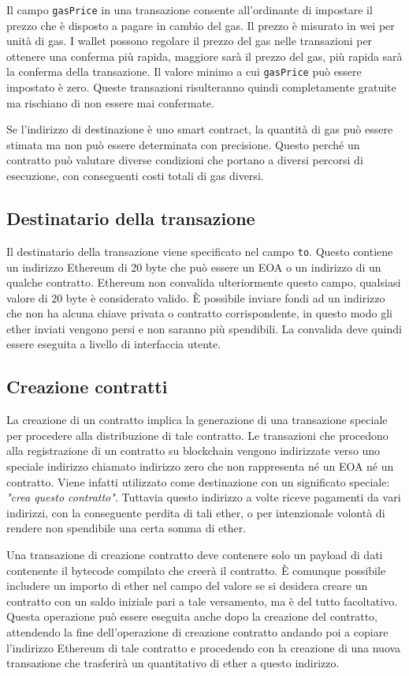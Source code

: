 Il campo \lstinline|gasPrice| in una transazione consente all'ordinante di impostare il prezzo che è disposto a pagare in cambio del gas. Il prezzo è misurato in wei per unità di gas. I wallet possono regolare il prezzo del gas nelle transazioni per ottenere una conferma più rapida, maggiore sarà il prezzo del gas, più rapida sarà la conferma della transazione. Il valore minimo a cui \lstinline|gasPrice| può essere impostato è zero. Queste transazioni risulteranno quindi completamente gratuite ma rischiano di non essere mai confermate. 

Se l'indirizzo di destinazione è uno smart contract, la quantità di gas può essere stimata ma non può essere determinata con precisione. Questo perché un contratto può valutare diverse condizioni che portano a diversi percorsi di esecuzione, con conseguenti costi totali di gas diversi. 

\subsection*{Destinatario della transazione}
Il destinatario della transazione viene specificato nel campo \lstinline|to|. Questo contiene un indirizzo Ethereum di 20 byte che può essere un EOA o un indirizzo di un qualche contratto. Ethereum non convalida ulteriormente questo campo, qualsiasi valore di 20 byte è considerato valido. \`E possibile inviare fondi ad un indirizzo che non ha alcuna chiave privata o contratto corrispondente, in questo modo gli ether inviati vengono persi e non saranno più spendibili. La convalida deve quindi essere eseguita a livello di interfaccia utente.

\subsection{Creazione contratti}
La creazione di un contratto implica la generazione di una transazione speciale per procedere alla distribuzione di tale contratto. Le transazioni che procedono alla registrazione di un contratto su blockchain vengono indirizzate verso uno speciale indirizzo chiamato indirizzo zero che non rappresenta né un EOA né un contratto. Viene infatti utilizzato come destinazione con un significato speciale: \textit{"crea questo contratto"}. Tuttavia questo indirizzo a volte riceve pagamenti da vari indirizzi, con la conseguente perdita di tali ether, o per intenzionale volontà di rendere non spendibile una certa somma di ether.

Una transazione di creazione contratto deve contenere solo un payload di dati contenente il bytecode compilato che creerà il contratto. \`E comunque possibile includere un importo di ether nel campo del valore se si desidera creare un contratto con un saldo iniziale pari a tale versamento, ma è del tutto facoltativo. Questa operazione può essere eseguita anche dopo la creazione del contratto, attendendo la fine dell'operazione di creazione contratto andando poi a copiare l'indirizzo Ethereum di tale contratto e procedendo con la  creazione di una nuova transazione che trasferirà un quantitativo di ether a questo indirizzo.

